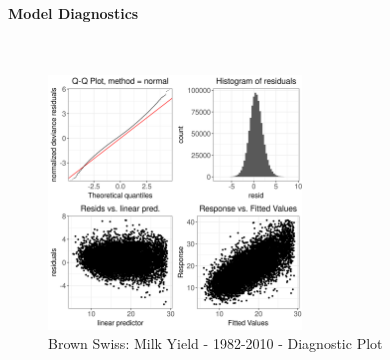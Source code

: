\paragraph{Model Diagnostics} \quad \\
\begin{figure}[H]
    \centering
    \includegraphics[width=0.6\textwidth]{thesis/figures/models/milk/before2010/bs_milk_before2010/bs_milk_before2010_diagnostics.png}
    \caption[]{Brown Swiss: Milk Yield - 1982-2010 - Diagnostic Plot}
\end{figure}

\newpage
